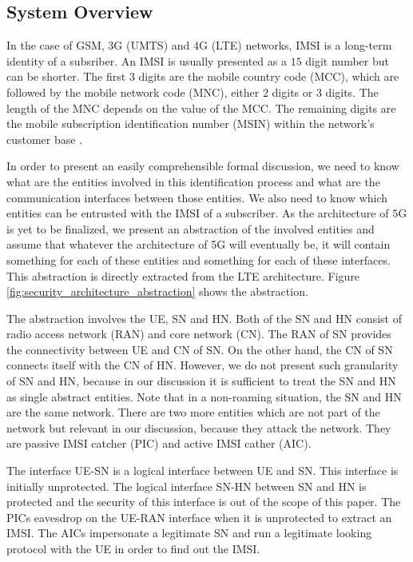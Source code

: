 \documentclass[runningheads,a4paper]{llncs} %
\begin{document}
\subsection{System Overview}
In the case of GSM, 3G (UMTS) and 4G (LTE) networks, IMSI is a long-term identity of a subsriber. An IMSI is usually presented as a $15$ digit number but can be shorter. The first $3$ digits are the mobile country code (MCC), which are followed by the mobile network code (MNC), either $2$ digits or $3$ digits. The length of the MNC depends on the value of the MCC. The remaining digits are the mobile subscription identification number (MSIN) within the network's customer base \cite{TS23003}. 

In order to present an easily comprehensible formal discussion, we need to know what are the entities involved in this identification process and what are the communication interfaces between those entities. We also need to know which entities can be entrusted with the IMSI of a subscriber. As the architecture of 5G is yet to be finalized, we present an abstraction of the involved entities and assume that whatever the architecture of 5G will eventually be, it will contain something for each of these entities and something for each of these interfaces. This abstraction is directly extracted from the LTE architecture. Figure \ref{fig:security_architecture_abstraction} shows the abstraction.

The abstraction involves the UE, SN and HN. Both of the SN and HN consist of radio access network (RAN) and core network (CN). The RAN of SN provides the connectivity between UE and CN of SN. On the other hand, the CN of SN connects itself with the CN of HN. However, we do not present such granularity of SN and HN, because in our discussion it is sufficient to treat the SN and HN as single abstract entities. Note that in a non-roaming situation, the SN and HN are the same network. There are two more entities which are not part of the network but relevant in our discussion, because they attack the network. They are passive IMSI catcher (PIC) and active IMSI cather (AIC). 

The interface UE-SN is a logical interface between UE and SN. This interface is initially unprotected. The logical interface SN-HN between SN and HN is protected and the security of this interface is out of the scope of this paper. The PICs eavesdrop on the UE-RAN interface when it is unprotected to extract an IMSI. The AICs impersonate a legitimate SN and run a legitimate looking protocol with the UE in order to find out the IMSI. 
\end{document}
